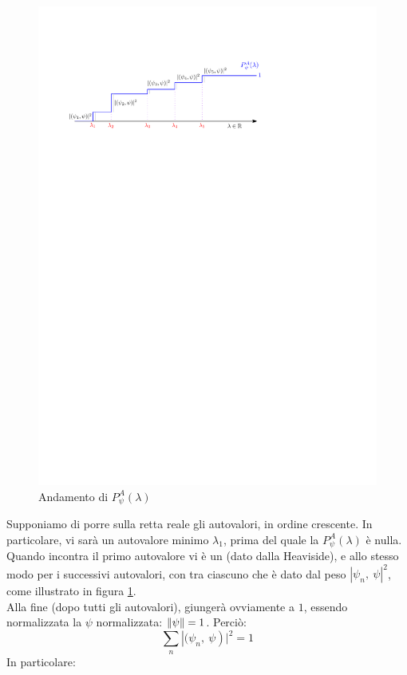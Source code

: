 \documentclass[../../FisicaTeorica.tex]{subfiles}
\begin{document}
\begin{figure}
    \centering
    \includegraphics{Immagini/Heaviside.pdf}
    \caption{Andamento di $P_\psi^A(\lambda)$}
    \label{fig:Pautov}
\end{figure}
Supponiamo di porre sulla retta reale gli autovalori, in ordine crescente. In particolare, vi sarà un autovalore minimo $\lambda_1$, prima del quale la $P_\psi^A\left(\lambda\right)$ è nulla. Quando incontra il primo autovalore vi è un  (dato dalla Heaviside), e allo stesso modo per i successivi autovalori, con  tra ciascuno che è dato dal peso $\left|\psi_n,\ \psi\right|^2$, come illustrato in figura \ref{fig:Pautov}.\\
Alla fine (dopo tutti gli autovalori), giungerà ovviamente a $1$, essendo normalizzata la $\psi$ normalizzata: $\left\lVert\psi\right\rVert=1$. Perciò:
\[
\sum_{n}\left|(\psi_n,\ \psi\right)|^2=1
\]
In particolare:
\end{document}
